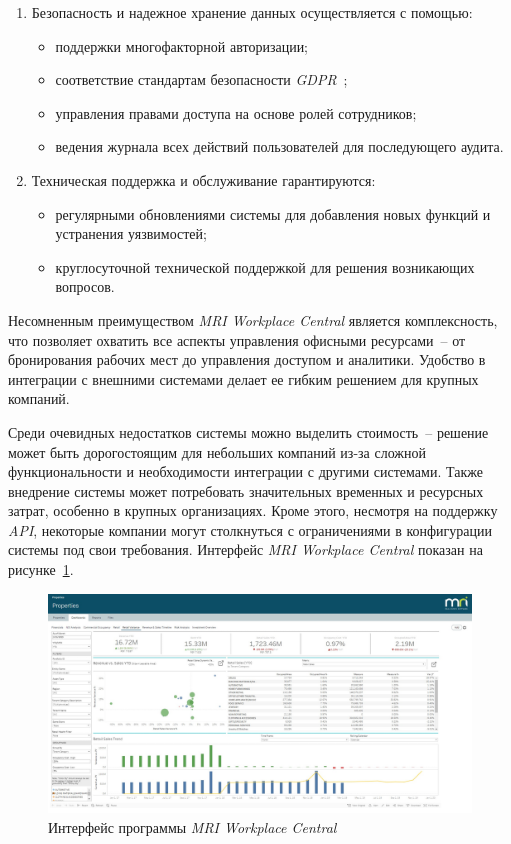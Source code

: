 \begin{enumerate}
    \item Безопасность и надежное хранение данных осуществляется с помощью:
        \begin{itemize}
            \item поддержки многофакторной авторизации;
            \item соответствие стандартам безопасности \textit{GDPR}~\cite{web_gdpr};
            \item управления правами доступа на основе ролей сотрудников;
            \item ведения журнала всех действий пользователей для последующего аудита.
        \end{itemize}

    \item Техническая поддержка и обслуживание гарантируются:
        \begin{itemize}
            \item регулярными обновлениями системы для добавления новых функций и устранения уязвимостей;
            \item круглосуточной технической поддержкой для решения возникающих вопросов.
        \end{itemize}
\end{enumerate}

Несомненным преимуществом \textit{MRI Workplace Central} является комплексность, что позволяет охватить все аспекты управления офисными ресурсами~-- от бронирования рабочих мест до управления доступом и аналитики. Удобство в интеграции с внешними системами делает ее гибким решением для крупных компаний.

Среди очевидных недостатков системы можно выделить стоимость~-- решение может быть дорогостоящим для небольших компаний из-за сложной функциональности и необходимости интеграции с другими системами. Также внедрение системы может потребовать значительных временных и ресурсных затрат, особенно в крупных организациях. Кроме этого, несмотря на поддержку \textit{API}, некоторые компании могут столкнуться с ограничениями в конфигурации системы под свои требования. Интерфейс \textit{MRI Workplace Central} показан на рисунке~\ref{fig:mri-workplace-central-demo}.

\begin{figure}[h]
\centering
    \includegraphics[width=0.99\linewidth]{assets/mri-workplace-central-demo.jpg}
    \caption{Интерфейс программы \textit{MRI Workplace Central}}
    \label{fig:mri-workplace-central-demo}
\end{figure}

